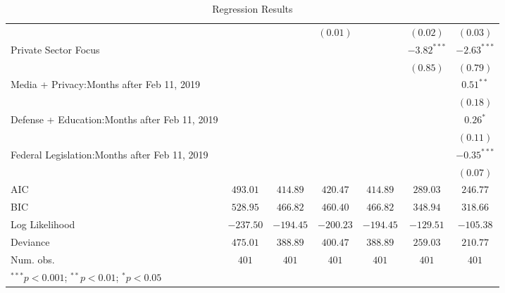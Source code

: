 \begin{table}
\begin{center}
\begin{tabular}{l c c c c c c}
                                                  &              &               & $(0.01)$      &               & $(0.02)$      & $(0.03)$      \\
Private Sector Focus                            &              &               &               &               & $-3.82^{***}$ & $-2.63^{***}$ \\
                                                  &              &               &               &               & $(0.85)$      & $(0.79)$      \\
Media + Privacy:Months after Feb 11, 2019     &              &               &               &               &               & $0.51^{**}$   \\
                                                  &              &               &               &               &               & $(0.18)$      \\
Defense + Education:Months after Feb 11, 2019 &              &               &               &               &               & $0.26^{*}$    \\
                                                  &              &               &               &               &               & $(0.11)$      \\
Federal Legislation:Months after Feb 11, 2019 &              &               &               &               &               & $-0.35^{***}$ \\
                                                  &              &               &               &               &               & $(0.07)$      \\
\hline
AIC                                               & $493.01$     & $414.89$      & $420.47$      & $414.89$      & $289.03$      & $246.77$      \\
BIC                                               & $528.95$     & $466.82$      & $460.40$      & $466.82$      & $348.94$      & $318.66$      \\
Log Likelihood                                    & $-237.50$    & $-194.45$     & $-200.23$     & $-194.45$     & $-129.51$     & $-105.38$     \\
Deviance                                          & $475.01$     & $388.89$      & $400.47$      & $388.89$      & $259.03$      & $210.77$      \\
Num. obs.                                         & $401$        & $401$         & $401$         & $401$         & $401$         & $401$         \\
\hline
\multicolumn{7}{l}{\scriptsize{$^{***}p<0.001$; $^{**}p<0.01$; $^{*}p<0.05$}}
\end{tabular}
\caption{Regression Results}
\label{table:coefficients}
\end{center}
\end{table}
